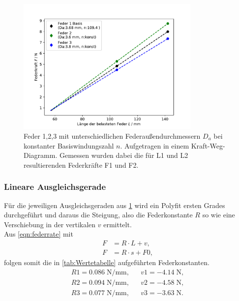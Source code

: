 \begin{figure}[H]
    \center
    \includegraphics[width=0.8\textwidth]{plots/D_kraftweg_dia.pdf}
    \caption{Feder 1,2,3 mit unterschiedlichen Federaußendurchmessern $D_a$ bei konstanter Basiswindungszahl $n$.
    Aufgetragen in einem Kraft-Weg-Diagramm. Gemessen wurden dabei
    die für L1 und L2 resultierenden Federkräfte F1 und F2.}
    \label{tab:LF_D}
\end{figure}
\subsubsection{Lineare Ausgleichsgerade}
\label{sec:fit}
Für die jeweiligen Ausgleichsgeraden aus \ref{tab:LF_D} wird ein Polyfit \cite{numpy_polyfit}
ersten Grades durchgeführt und daraus die Steigung, also die Federkonstante $R$ so wie eine Verschiebung
in der vertikalen $v$ ermittelt.\\
Aus \ref{eqn:federrate} mit
\begin{align*}
  F&=R \cdot L + v ,\\
  F&=R \cdot s + F0,
\end{align*}
folgen somit die in \ref{tab:Wertetabelle} aufgeführten Federkonstanten.
\begin{align*}
  R1= 0.086\;\si{\N\per\mm}, &&  v1= -4.14\;\si{\N},\\
  R2= 0.094\;\si{\N\per\mm}, &&  v2= -4.58\;\si{\N},\\
  R3= 0.077\;\si{\N\per\mm}, &&  v3= -3.63\;\si{\N}.\\
\end{align*}

